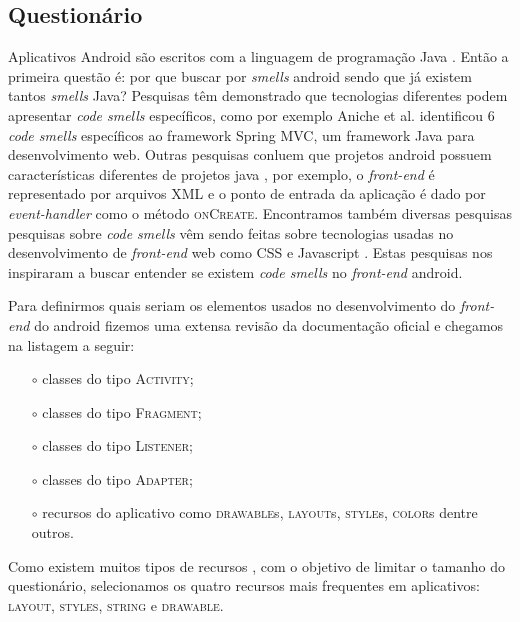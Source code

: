 \subsection{Question\'ario}
\label{sub:questionario}

Aplicativos Android s\~ao escritos com a linguagem de programa\c{c}\~ao Java \cite{AndroidFundamentals}. Ent\~ao a primeira quest\~ao \'e: por que buscar por \textit{smells} android sendo que j\'a existem tantos \textit{smells} Java? Pesquisas t\^em demonstrado que tecnologias diferentes podem apresentar \textit{code smells} espec\'ificos, como por exemplo Aniche et al. identificou 6 \textit{code smells} espec\'ificos ao framework Spring MVC, um framework Java para desenvolvimento web. Outras pesquisas conluem que projetos android possuem caracter\'isticas diferentes de projetos java \cite{Hecht2015, Mannan_Dig_Ahmed_Jensen_Abdullah_Almurshed, ReimannBrylski2013}, por exemplo, o \textit{front-end} \'e representado por arquivos XML e o ponto de entrada da aplica\c{c}\~ao \'e dado por \textit{event-handler} \cite{AndroidActivities2016} como o m\'etodo \textsc{onCreate}. Encontramos tamb\'em diversas pesquisas pesquisas sobre \textit{code smells} v\^em sendo feitas sobre tecnologias usadas no desenvolvimento de \textit{front-end} web como CSS \cite{CSSCodeSmell} e Javascript \cite{BB}. Estas pesquisas nos inspiraram a buscar entender se existem \textit{code smells} no \textit{front-end} android.

Para definirmos quais seriam os elementos usados no desenvolvimento do \textit{front-end} do android fizemos uma extensa revis\~ao da documenta\c{c}\~ao oficial \cite{AndroidDeveloperSite2016} e chegamos na listagem a seguir:

\begin{itemize} 
	\item[$\circ$] classes do tipo \textsc{Activity};
	\item[$\circ$] classes do tipo \textsc{Fragment};
	\item[$\circ$] classes do tipo \textsc{Listener};
	\item[$\circ$] classes do tipo \textsc{Adapter};
	\item[$\circ$] recursos do aplicativo como \textsc{drawable}s, \textsc{layout}s, \textsc{style}s, \textsc{color}s dentre outros.
\end{itemize}

Como existem muitos tipos de recursos \cite{AndroidResourcesOverview}, com o objetivo de limitar o tamanho do question\'ario, selecionamos os quatro recursos mais frequentes em aplicativos: \textsc{layout}, \textsc{styles}, \textsc{string} e \textsc{drawable}.

